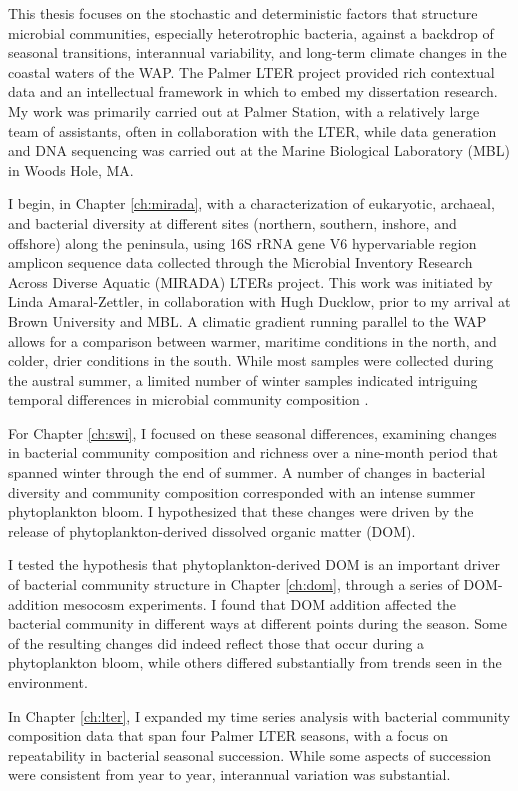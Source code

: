 This thesis focuses on the stochastic and deterministic factors that structure microbial communities, especially heterotrophic bacteria, against a backdrop of seasonal transitions, interannual variability, and long-term climate changes in the coastal waters of the WAP. The Palmer LTER project provided rich contextual data and an intellectual framework in which to embed my dissertation research. My work was primarily carried out at Palmer Station, with a relatively large team of assistants, often in collaboration with the LTER, while data generation and DNA sequencing was carried out at the Marine Biological Laboratory (MBL) in Woods Hole, MA.
 
I begin, in Chapter \ref{ch:mirada}, with a characterization of eukaryotic, archaeal, and bacterial diversity at different sites (northern, southern, inshore, and offshore) along the peninsula, using 16S rRNA gene V6 hypervariable region amplicon sequence data collected through the Microbial Inventory Research Across Diverse Aquatic (MIRADA) LTERs project. This work was initiated by Linda Amaral-Zettler, in collaboration with Hugh Ducklow, prior to my arrival at Brown University and MBL. A climatic gradient running parallel to the WAP allows for a comparison between warmer, maritime conditions in the north, and colder, drier conditions in the south. While most samples were collected during the austral summer, a limited number of winter samples indicated intriguing temporal differences in microbial community composition \citep{Luria2014-dj}.
 
For Chapter \ref{ch:swi}, I focused on these seasonal differences, examining changes in bacterial community composition and richness over a nine-month period that spanned winter through the end of summer. A number of changes in bacterial diversity and community composition corresponded with an intense summer phytoplankton bloom. I hypothesized that these changes were driven by the release of phytoplankton-derived dissolved organic matter (DOM).
 
I tested the hypothesis that phytoplankton-derived DOM is an important driver of bacterial community structure in Chapter \ref{ch:dom}, through a series of DOM-addition mesocosm experiments. I found that DOM addition affected the bacterial community in different ways at different points during the season. Some of the resulting changes did indeed reflect those that occur during a phytoplankton bloom, while others differed substantially from trends seen in the environment.
 
In Chapter \ref{ch:lter}, I expanded my time series analysis with bacterial community composition data that span four Palmer LTER seasons, with a focus on repeatability in bacterial seasonal succession. While some aspects of succession were consistent from year to year, interannual variation was substantial.
 
